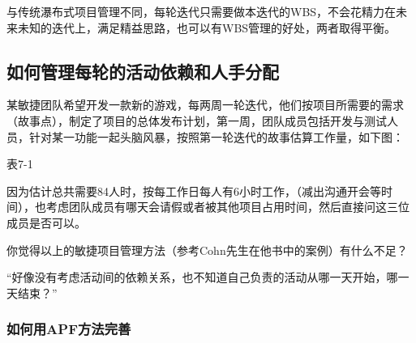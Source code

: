 与传统瀑布式项目管理不同，每轮迭代只需要做本迭代的WBS，不会花精力在未来未知的迭代上，满足精益思路，也可以有WBS管理的好处，两者取得平衡。

\hypertarget{ux5982ux4f55ux7ba1ux7406ux6bcfux8f6eux7684ux6d3bux52a8ux4f9dux8d56ux548cux4ebaux624bux5206ux914d}{%
\subsection{如何管理每轮的活动依赖和人手分配}\label{ux5982ux4f55ux7ba1ux7406ux6bcfux8f6eux7684ux6d3bux52a8ux4f9dux8d56ux548cux4ebaux624bux5206ux914d}}

某敏捷团队希望开发一款新的游戏，每两周一轮迭代，他们按项目所需要的需求（故事点），制定了项目的总体发布计划，第一周，团队成员包括开发与测试人员，针对某一功能一起头脑风暴，按照第一轮迭代的故事估算工作量，如下图：



表7-1

因为估计总共需要84人时，按每工作日每人有6小时工作，（减出沟通开会等时间），也考虑团队成员有哪天会请假或者被其他项目占用时间，然后直接问这三位成员是否可以。

你觉得以上的敏捷项目管理方法（参考Cohn先生在他书中的案例）有什么不足？

``好像没有考虑活动间的依赖关系，也不知道自己负责的活动从哪一天开始，哪一天结束？''

\hypertarget{ux5982ux4f55ux7528apfux65b9ux6cd5ux5b8cux5584}{%
\subsubsection{如何用APF方法完善}\label{ux5982ux4f55ux7528apfux65b9ux6cd5ux5b8cux5584}}


